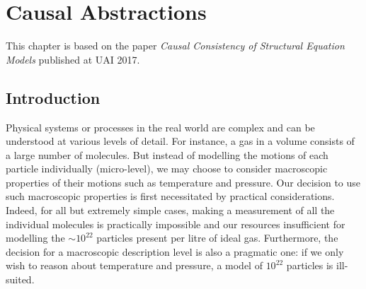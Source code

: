 \chapter{Causal Abstractions}

\ifpdf
    \graphicspath{{Chapter3/Figs/Raster/}{Chapter3/Figs/PDF/}{Chapter3/Figs/}}
\else
    \graphicspath{{Chapter3/Figs/Vector/}{Chapter3/Figs/}}
\fi

This chapter is based on the paper \emph{Causal Consistency of Structural Equation Models} published at UAI 2017.


%
%





\section{Introduction}


Physical systems or processes in the real world are complex and can be understood at various levels of detail.
For instance, a gas in a volume consists of a large number of molecules.
But instead of modelling the motions of each particle individually (micro-level), we may choose to consider macroscopic properties of their motions such as temperature and pressure.
Our decision to use such macroscopic properties is first necessitated by practical considerations.
Indeed, for all but extremely simple cases, making a measurement of all the individual molecules is practically impossible and our resources insufficient for modelling the ${\sim}10^{22}$ particles present per litre of ideal gas.
Furthermore, the decision for a macroscopic description level is also a pragmatic one: if we only wish to reason about temperature and pressure, a model of $10^{22}$ particles is ill-suited.

